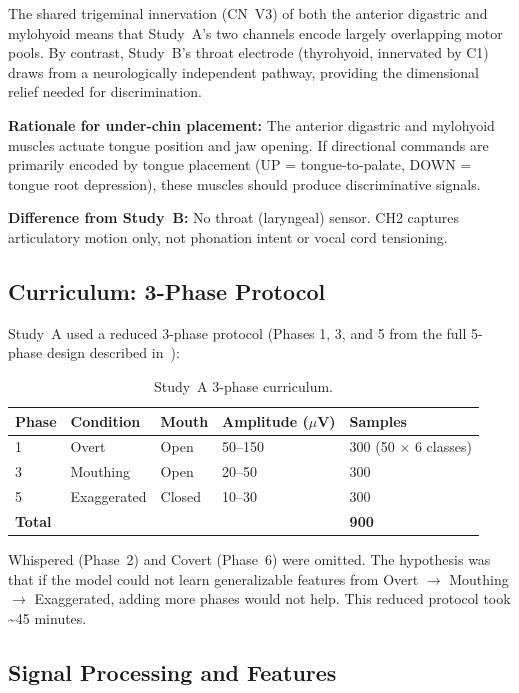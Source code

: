 \documentclass{article}
\begin{document}
The shared trigeminal innervation (CN~V3) of both the anterior digastric and mylohyoid means that Study~A's two channels encode largely overlapping motor pools. By contrast, Study~B's throat electrode (thyrohyoid, innervated by C1) draws from a neurologically independent pathway, providing the dimensional relief needed for discrimination.

\textbf{Rationale for under-chin placement:} The anterior digastric and mylohyoid muscles actuate tongue position and jaw opening. If directional commands are primarily encoded by tongue placement (UP = tongue-to-palate, DOWN = tongue root depression), these muscles should produce discriminative signals.

\textbf{Difference from Study~B:} No throat (laryngeal) sensor. CH2 captures articulatory motion only, not phonation intent or vocal cord tensioning.

\subsection{Curriculum: 3-Phase Protocol}

Study~A used a reduced 3-phase protocol (Phases 1, 3, and 5 from the full 5-phase design described in~\cite[{\S}4.2]{kho2026companion}):

\begin{table}[ht]
\centering
\caption{Study~A 3-phase curriculum.}
\label{tab:curriculum}
\begin{tabular}{@{}lllll@{}}
\toprule
Phase & Condition & Mouth & Amplitude ($\mu$V) & Samples \\
\midrule
1 & Overt & Open & 50--150 & 300 (50 $\times$ 6 classes) \\
3 & Mouthing & Open & 20--50 & 300 \\
5 & Exaggerated & Closed & 10--30 & 300 \\
\midrule
\textbf{Total} & & & & \textbf{900} \\
\bottomrule
\end{tabular}
\end{table}

Whispered (Phase~2) and Covert (Phase~6) were omitted. The hypothesis was that if the model could not learn generalizable features from Overt $\to$ Mouthing $\to$ Exaggerated, adding more phases would not help. This reduced protocol took \textasciitilde45 minutes.

\subsection{Signal Processing and Features}
\end{document}
